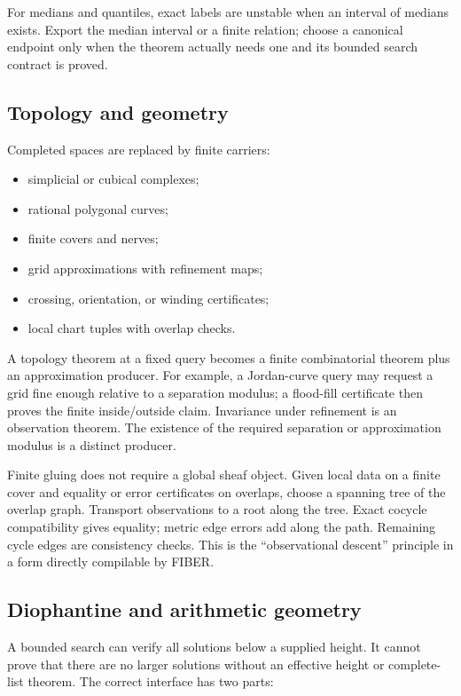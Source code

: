 For medians and quantiles, exact labels are unstable when an interval of
medians exists.  Export the median interval or a finite relation; choose a
canonical endpoint only when the theorem actually needs one and its bounded
search contract is proved.

\subsection{Topology and geometry}

Completed spaces are replaced by finite carriers:

\begin{itemize}
\item simplicial or cubical complexes;
\item rational polygonal curves;
\item finite covers and nerves;
\item grid approximations with refinement maps;
\item crossing, orientation, or winding certificates;
\item local chart tuples with overlap checks.
\end{itemize}

A topology theorem at a fixed query becomes a finite combinatorial theorem plus
an approximation producer.  For example, a Jordan-curve query may request a
grid fine enough relative to a separation modulus; a flood-fill certificate
then proves the finite inside/outside claim.  Invariance under refinement is an
observation theorem.  The existence of the required separation or approximation
modulus is a distinct producer.

Finite gluing does not require a global sheaf object.  Given local data on a
finite cover and equality or error certificates on overlaps, choose a spanning
tree of the overlap graph.  Transport observations to a root along the tree.
Exact cocycle compatibility gives equality; metric edge errors add along the
path.  Remaining cycle edges are consistency checks.  This is the
``observational descent'' principle in a form directly compilable by FIBER.

\subsection{Diophantine and arithmetic geometry}

A bounded search can verify all solutions below a supplied height.  It cannot
prove that there are no larger solutions without an effective height or
complete-list theorem.  The correct interface has two parts:

